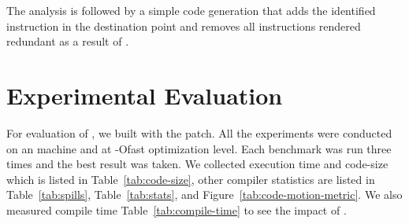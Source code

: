 \documentclass[sigplan,10pt,review,anonymous]{acmart}\settopmatter{printfolios=true,printccs=false,printacmref=false}
\begin{document}
The analysis is followed by a simple code generation that adds the identified
instruction in the destination point and removes all instructions rendered
redundant as a result of \gcm{}.


\section{Experimental Evaluation}
\label{sec:experimental-results}
For evaluation of \gcm{}, we built \SPEC{} with the patch. All the experiments
were conducted on an \xlinux{} machine and at -Ofast optimization level. Each
benchmark was run three times and the best result was taken. We collected
execution time and code-size which is listed in Table~\ref{tab:code-size}, other
compiler statistics are listed in Table~\ref{tab:spills}, Table~\ref{tab:stats}, and
Figure~\ref{tab:code-motion-metric}.  We also measured compile time
Table~\ref{tab:compile-time} to see the impact of \gcm{}.
\end{document}
